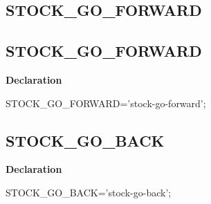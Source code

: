 \documentclass{report}
\newif\ifpdf
\begin{document}
\subsection*{\large{\textbf{STOCK{\_}GO{\_}FORWARD}}\normalsize\hspace{1ex}\hrulefill}
\else
\subsection*{STOCK{\_}GO{\_}FORWARD}
\fi
\label{common-STOCK_GO_FORWARD}
\begin{list}{}{
\setlength{\itemindent}{0cm}
\setlength{\listparindent}{0cm}
\setlength{\leftmargin}{\evensidemargin}
\addtolength{\leftmargin}{\tmplength}
\settowidth{\labelsep}{X}
\addtolength{\leftmargin}{\labelsep}
\setlength{\labelwidth}{\tmplength}
}
\item[\textbf{Declaration}\hfill]
\ifpdf
\begin{flushleft}
\fi
\begin{ttfamily}
STOCK{\_}GO{\_}FORWARD='stock-go-forward';\end{ttfamily}

\ifpdf
\end{flushleft}
\fi

\end{list}
\ifpdf
\subsection*{\large{\textbf{STOCK{\_}GO{\_}BACK}}\normalsize\hspace{1ex}\hrulefill}
\else
\subsection*{STOCK{\_}GO{\_}BACK}
\fi
\label{common-STOCK_GO_BACK}
\begin{list}{}{
\setlength{\itemindent}{0cm}
\setlength{\listparindent}{0cm}
\setlength{\leftmargin}{\evensidemargin}
\addtolength{\leftmargin}{\tmplength}
\settowidth{\labelsep}{X}
\addtolength{\leftmargin}{\labelsep}
\setlength{\labelwidth}{\tmplength}
}
\item[\textbf{Declaration}\hfill]
\ifpdf
\begin{flushleft}
\fi
\begin{ttfamily}
STOCK{\_}GO{\_}BACK='stock-go-back';\end{ttfamily}

\ifpdf
\end{flushleft}
\fi

\end{list}
\ifpdf
\end{document}
